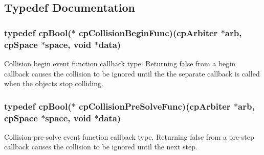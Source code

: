 \subsection{Typedef Documentation}
\hypertarget{group__cp_arbiter_ga1abb3a86eb2889bf32349de4c8237612}{
\subsubsection[{cp\-Collision\-Begin\-Func}]{\setlength{\rightskip}{0pt plus 5cm}typedef {\bf cp\-Bool}($\ast$ {\bf cp\-Collision\-Begin\-Func})({\bf cp\-Arbiter} $\ast$arb, {\bf cp\-Space} $\ast$space, void $\ast$data)}}\label{group__cp_arbiter_ga1abb3a86eb2889bf32349de4c8237612}
Collision begin event function callback type. Returning false from a begin callback causes the collision to be ignored until the the separate callback is called when the objects stop colliding. \hypertarget{group__cp_arbiter_ga00b9651732d9674c945334ed1968d19b}{
\subsubsection[{cp\-Collision\-Pre\-Solve\-Func}]{\setlength{\rightskip}{0pt plus 5cm}typedef {\bf cp\-Bool}($\ast$ {\bf cp\-Collision\-Pre\-Solve\-Func})({\bf cp\-Arbiter} $\ast$arb, {\bf cp\-Space} $\ast$space, void $\ast$data)}}\label{group__cp_arbiter_ga00b9651732d9674c945334ed1968d19b}
Collision pre-\/solve event function callback type. Returning false from a pre-\/step callback causes the collision to be ignored until the next step. 

